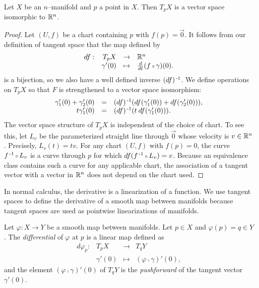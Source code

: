 \begin{prop}
	\label{prop:tangentspacevectorspace}
	Let $X$ be an $n$--manifold and $p$ a point in $X$.
	Then $T_p X$ is a vector space isomorphic to $\mathbb{R}^n$.
\end{prop}

\begin{proof}
	Let $(U,f)$ be a chart containing $p$ with $f(p)=\vec{0}$.
	It follows from our definition of tangent space that the map defined by
	\[
		\begin{array}{crcl}
			df : & T_p X & \to & \RRN \\
			& \gamma'(0) & \mapsto & \Ddt(f\comp \gamma)(0) .
		\end{array}
	\]
	is a bijection, so we also have a well defined inverse $(df)^{\,\text{-}1}$.
	We define operations on $T_p X$ so that $F$ is strengthened to a vector space isomorphism:
	\[
		\begin{array}{rcl}
			\gamma_1'(0)+\gamma_2'(0) & = & (df)^{\,\text{-}1}(df(\gamma_1'(0))+df(\gamma_2'(0))), \\
			t\gamma_1'(0) & = & (df)^{\,\text{-}1}(t\:df(\gamma_1'(0))).
		\end{array}
	\]
	The vector space structure of $T_p X$ is independent of the choice of chart.
	To see this, let $L_v$ be the parameterized straight line through $\vec{0}$ whose velocity is $v\in\mathbb{R}^n$.
	Precisely, $L_v(t)=tv.$
	For any chart $(U,f)$ with $f(p)=0$, the curve $f\inv\comp L_v$ is a curve through $p$ for which $df(f\inv\comp L_v)=v$.
	Because an equivalence class contains such a curve for any applicable chart, the association of a tangent vector with a vector in $\mathbb{R}^n$ does not depend on the chart used.
\end{proof}

In normal calculus, the derivative is a linearization of a function.
We use tangent spaces to define the derivative of a smooth map between manifolds because tangent spaces are used as pointwise linearizations of manifolds.

\begin{defn}[Differential]
	Let $\varphi:X\to Y$ be a smooth map between manifolds.
	Let $p\in X$ and $\varphi(p)=q\in Y$.
	The \emph{differential} of $\varphi$ at $p$ is a linear map defined as
	\[
		\begin{array}{crcl}
			d\varphi_p: & T_p X & \to & T_q Y\\
					  & \gamma'(0) & \mapsto & (\varphi\comp\gamma)'(0),
		\end{array}
	\]
	and the element $(\varphi\comp\gamma)'(0)$ of $T_q Y$ is the \emph{pushforward} of the tangent vector $\gamma'(0)$.
\end{defn}

